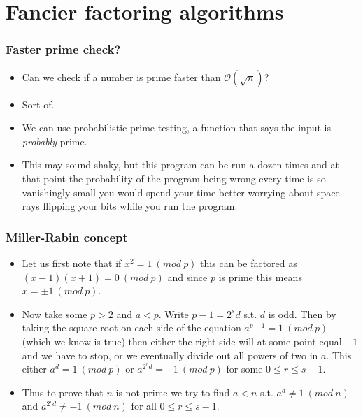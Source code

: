 \documentclass{beamer}
\begin{document}
\section*{Fancier factoring algorithms}

\begin{frame}[plain]
\frametitle{Faster prime check?}

\begin{itemize}
    \item Can we check if a number is prime faster than $\mathcal{O}(\sqrt{n})$?
    \item Sort of.
    \item We can use probabilistic prime testing, a function that says the input is \textit{probably} prime.
    \item This may sound shaky, but this program can be run a dozen times and at that point the probability of the program being wrong every
        time is so vanishingly small you would spend your time better worrying about space rays flipping your bits while you run the program.
\end{itemize}

\end{frame}

\begin{frame}[plain]
\frametitle{Miller-Rabin concept}

\begin{itemize}

\item Let us first note that if $x^2 = 1 \ (mod \ p)$ this can be factored as $(x-1)(x+1) = 0 \ (mod \ p)$ and since $p$ is prime this means $x = \pm 1 \ (mod \ p)$.

\item Now take some $p > 2$ and $a < p$. Write $p - 1 = 2^sd$ s.t. $d$ is odd. Then by taking the square root on each side of the equation $a^{p - 1} = 1 \ (mod \ p)$ (which we know is true) then either the right side will at some point equal $-1$ and we have to stop, or we eventually divide out all powers of two in $a$. This either $a^d = 1 \ (mod \ p)$ or $a^{2^r d} = -1 \ (mod \ p)$ for some $0 \leq r \leq s - 1$.

\item Thus to prove that $n$ is not prime we try to find $a < n$ s.t. $a^d \neq 1 \ (mod \ n)$ and $a^{2^rd} \neq -1 \ (mod \ n)$ for all $0 \leq r \leq s - 1$.

\end{itemize}

\end{frame}
\end{document}
